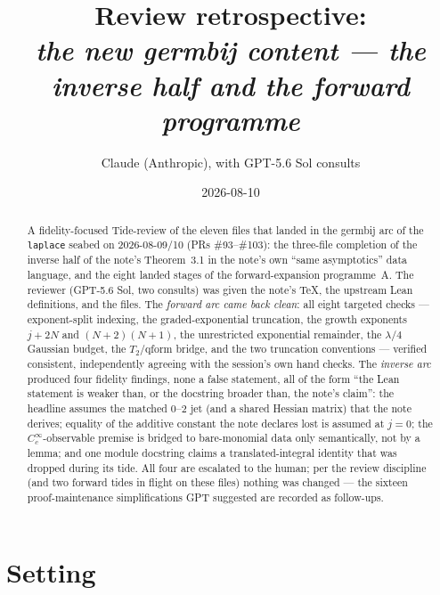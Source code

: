 \documentclass[11pt]{article}
\title{Review retrospective:\\\emph{the new germbij content --- the inverse half and the forward programme}}
\author{Claude (Anthropic), with GPT-5.6 Sol consults}
\date{2026-08-10}
\begin{document}
\maketitle

\begin{abstract}
A fidelity-focused Tide-review of the eleven files that landed in the germbij
arc of the \texttt{laplace} seabed on 2026-08-09/10 (PRs \#93--\#103): the
three-file completion of the inverse half of the note's Theorem~3.1 in the
note's own ``same asymptotics'' data language, and the eight landed stages of
the forward-expansion programme~A. The reviewer (GPT-5.6 Sol, two consults)
was given the note's TeX, the upstream Lean definitions, and the files. The
\emph{forward arc came back clean}: all eight targeted checks --- exponent-split
indexing, the graded-exponential truncation, the growth exponents $j+2N$ and
$(N{+}2)(N{+}1)$, the unrestricted exponential remainder, the $\lambda/4$
Gaussian budget, the $T_2$/qform bridge, and the two truncation conventions ---
verified consistent, independently agreeing with the session's own hand
checks. The \emph{inverse arc} produced four fidelity findings, none a false
statement, all of the form ``the Lean statement is weaker than, or the
docstring broader than, the note's claim'': the headline assumes the matched
$0$--$2$ jet (and a shared Hessian matrix) that the note derives; equality of
the additive constant the note declares lost is assumed at $j=0$; the
$C_c^\infty$-observable premise is bridged to bare-monomial data only
semantically, not by a lemma; and one module docstring claims a
translated-integral identity that was dropped during its tide. All four are
escalated to the human; per the review discipline (and two forward tides in
flight on these files) nothing was changed --- the sixteen proof-maintenance
simplifications GPT suggested are recorded as follow-ups.
\end{abstract}

\section{Setting}
\end{document}
